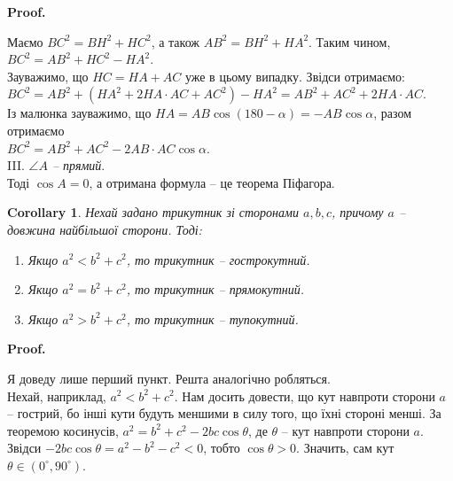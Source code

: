 \documentclass[a4paper, 10pt]{article}
\makeatletter
\theoremstyle{theoremdd}
\theoremstyle{theoremdd}
\theoremstyle{theoremdd}
\theoremstyle{theoremdd}
\theoremstyle{theoremdd}
\theoremstyle{theoremdd}
\theoremstyle{theoremdd}
\theoremstyle{theoremdd}
\theoremstyle{theoremdd}
\newtheorem{corollary}[theorem]{Corollary}
\renewenvironment{proof}[1][Proof.\\]{\par
\pushQED{\hfill \qed}%
\normalfont \topsep6\p@\@plus6\p@\relax
\trivlist
\item\relax
{\bfseries
#1\@addpunct{.}}\hspace\labelsep\ignorespaces
}{%
\popQED\endtrivlist\@endpefalse
}
\makeatother
\begin{document}
\begin{proof}
\begin{figure}[H]
\end{figure}
Маємо $BC^2 = BH^2 + HC^2$, а також $AB^2 = BH^2 + HA^2$. Таким чином, $BC^2 = AB^2 + HC^2 - HA^2$.\\
Зауважимо, що $HC = HA + AC$ уже в цьому випадку. Звідси отримаємо:\\
$BC^2 = AB^2 + (HA^2 + 2HA \cdot AC + AC^2) - HA^2 = AB^2 + AC^2 + 2HA \cdot AC$.\\
Із малюнка зауважимо, що $HA = AB \cos (180 - \alpha) = -AB \cos \alpha$, разом отримаємо \\
$BC^2 = AB^2 + AC^2 - 2AB \cdot AC \cos \alpha$.
\bigskip \\
III. \textit{$\angle A$ -- прямий}.\\
Тоді $\cos A = 0$, а отримана формула -- це теорема Піфагора.
\end{proof}

\begin{corollary}
Нехай задано трикутник зі сторонами $a,b,c$, причому $a$ -- довжина найбільшої сторони. Тоді:
\begin{enumerate}[nosep,wide=0pt,label={\arabic*)}]
\item Якщо $a^2 < b^2 + c^2$, то трикутник -- гострокутний.
\item Якщо $a^2 = b^2 + c^2$, то трикутник -- прямокутний.
\item Якщо $a^2 > b^2 + c^2$, то трикутник -- тупокутний.
\end{enumerate}
\end{corollary}

\begin{proof}
Я доведу лише перший пункт. Решта аналогічно робляться.\\
Нехай, наприклад, $a^2 < b^2 + c^2$. Нам досить довести, що кут навпроти сторони $a$ -- гострий, бо інші кути будуть меншими в силу того, що їхні стороні менші. За теоремою косинусів, $a^2 = b^2 + c^2 - 2bc \cos \theta$, де $\theta$ -- кут навпроти сторони $a$. Звідси $-2bc \cos \theta = a^2 - b^2 - c^2 < 0$, тобто $\cos \theta > 0$. Значить, сам кут $\theta \in (0^\circ,90^\circ)$.
\end{proof}
\end{document}
